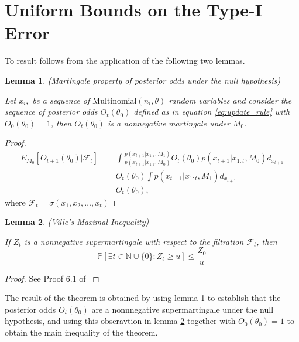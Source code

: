 \documentclass[11pt]{article}
\newtheorem{lemma}{Lemma}[section]
\begin{document}
\section{Uniform Bounds on the Type-I Error}
\label{app:type_1_error}
To result follows from the application of the following two lemmas.
\begin{lemma}(Martingale property of posterior odds under the null hypothesis)
  
  \noindent Let $x_i,$ be a sequence of $\text{Multinomial}(n_i,\theta)$ random variables and consider the sequence of posterior odds $O_t(\theta_0)$ defined as in equation \eqref{eq:update_rule} with $O_0(\theta_0)=1$, then $O_t(\theta_0)$ is a nonnegative martingale under $M_0$.
  \label{lem:posterior_odds_martingale}
    \end{lemma}
  \begin{proof}
  \begin{align*}
    E_{M_0}[O_{t+1}(\theta_0)|\mathcal{F}_t]  &= \int \frac{p(x_{t+1}|x_{1:t},M_1)}{p(x_{t+1}|x_{1:t},M_0)} O_{t}(\theta_0) p(x_{t+1}|x_{1:t},M_0) d_{x_{t+1}}\\
    &=  O_{t}(\theta_0) \int p(x_{t+1}|x_{1:t},M_1) d_{x_{t+1}}\\
    &=  O_{t}(\theta_0),
  \end{align*}
  where $\mathcal{F}_{t} = \sigma(x_1,x_2,\dots, x_t)$
\end{proof}

\begin{lemma}(Ville's Maximal Inequality)
  
\label{lem:durrett}
  \noindent If $Z_{t}$ is a nonnegative supermartingale with respect to the filtration $\mathcal{F}_t$, then
  \begin{equation}
    \label{eq:durrett}
    \mathbb{P}[\exists t \in \mathbb{N}\cup \lbrace 0 \rbrace : Z_t \geq u] \leq \frac{Z_0}{u}
  \end{equation}
\end{lemma}
\begin{proof}
  See Proof 6.1 of \cite{howard}
\end{proof}
The result of the theorem is obtained by using lemma \ref{lem:posterior_odds_martingale} to establish that the posterior odds $O_t(\theta_0)$ are a nonnnegative supermartingale under the null hypothesis, and using this obseravtion in lemma \ref{lem:durrett} together with  $O_0(\theta_0) = 1$  to obtain the main inequality of the theorem.
\end{document}
